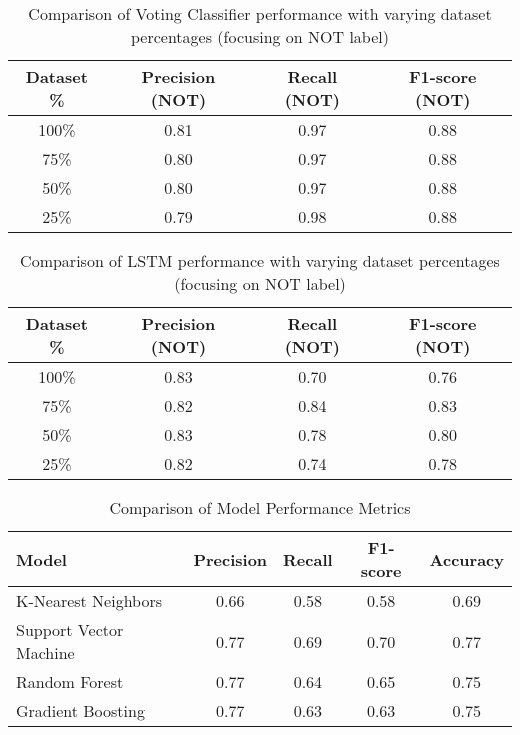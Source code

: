 \documentclass[11pt]{article}
\begin{document}
\begin{table}[h]
\centering
\begin{tabular}{|c|c|c|c|}
\hline
\textbf{Dataset \%} & \textbf{Precision (NOT)} & \textbf{Recall (NOT)} & \textbf{F1-score (NOT)} \\ \hline
100\%               & 0.81                     & 0.97                  & 0.88                    \\ \hline
75\%                & 0.80                     & 0.97                  & 0.88                    \\ \hline
50\%                & 0.80                     & 0.97                  & 0.88                    \\ \hline
25\%                & 0.79                     & 0.98                  & 0.88                    \\ \hline
\end{tabular}
\caption{Comparison of Voting Classifier performance with varying dataset percentages (focusing on NOT label)}
\label{table:voting_classifier_performance_comparison_not}
\end{table}

\begin{table}[h]
\centering
\begin{tabular}{|c|c|c|c|}
\hline
\textbf{Dataset \%} & \textbf{Precision (NOT)} & \textbf{Recall (NOT)} & \textbf{F1-score (NOT)} \\ \hline
100\%               & 0.83                     & 0.70                  & 0.76                    \\ \hline
75\%                & 0.82                     & 0.84                  & 0.83                    \\ \hline
50\%                & 0.83                     & 0.78                  & 0.80                    \\ \hline
25\%                & 0.82                     & 0.74                  & 0.78                    \\ \hline
\end{tabular}
\caption{Comparison of LSTM performance with varying dataset percentages (focusing on NOT label)}
\label{table:lstm_performance_comparison_not}
\end{table}

\begin{table}[ht]
\centering
\begin{tabular}{|l|c|c|c|c|}
\hline
\textbf{Model} & \textbf{Precision} & \textbf{Recall} & \textbf{F1-score} & \textbf{Accuracy} \\
\hline
K-Nearest Neighbors & 0.66 & 0.58 & 0.58 & 0.69 \\
\hline
Support Vector Machine & 0.77 & 0.69 & 0.70 & 0.77 \\
\hline
Random Forest & 0.77 & 0.64 & 0.65 & 0.75 \\
\hline
Gradient Boosting & 0.77 & 0.63 & 0.63 & 0.75 \\
\hline
\end{tabular}
\caption{Comparison of Model Performance Metrics}
\label{tab:model_comparison}
\end{table}
\end{document}
